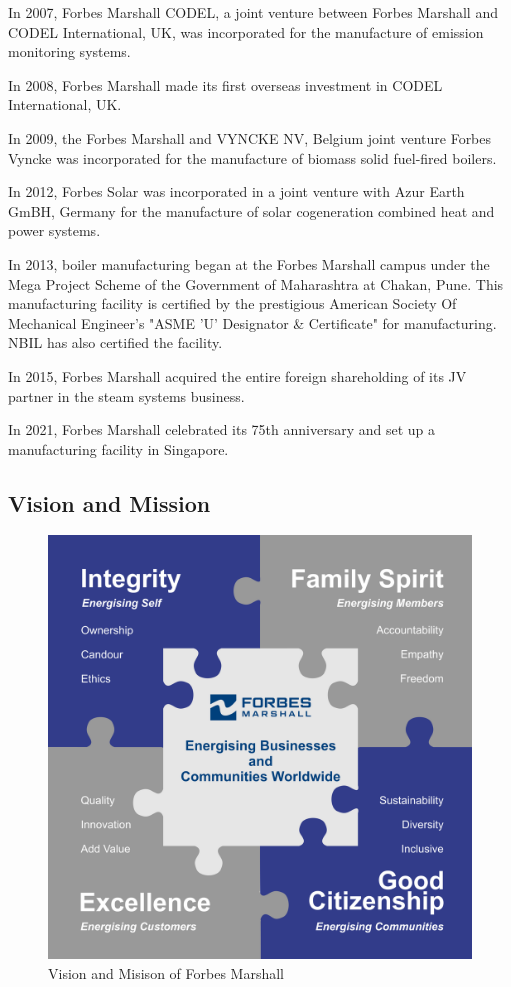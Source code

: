 In 2007, Forbes Marshall CODEL, a joint venture between Forbes Marshall and CODEL International, UK, was incorporated for the manufacture of emission monitoring systems.

In 2008, Forbes Marshall made its first overseas investment in CODEL International, UK.

In 2009, the Forbes Marshall and VYNCKE NV, Belgium joint venture Forbes Vyncke was incorporated for the manufacture of biomass solid fuel-fired boilers.

In 2012, Forbes Solar was incorporated in a joint venture with Azur Earth GmBH, Germany for the manufacture of solar cogeneration combined heat and power systems.

In 2013, boiler manufacturing began at the Forbes Marshall campus under the Mega Project Scheme of the Government of Maharashtra at Chakan, Pune. This manufacturing facility is certified by the prestigious American Society Of Mechanical Engineer's "ASME 'U' Designator \& Certificate" for manufacturing. NBIL has also certified the facility.

In 2015, Forbes Marshall acquired the entire foreign shareholding of its JV partner in the steam systems business.

In 2021, Forbes Marshall celebrated its 75th anniversary and set up a manufacturing facility in Singapore.

\subsection{Vision and Mission}
\begin{figure}[ht]
    \centering
    \includegraphics[width=0.5\linewidth]{figs/forbes_marshall_values.png}
    \caption{Vision and Misison of Forbes Marshall}
    \label{fig:forbes_marshall_values}
\end{figure}

